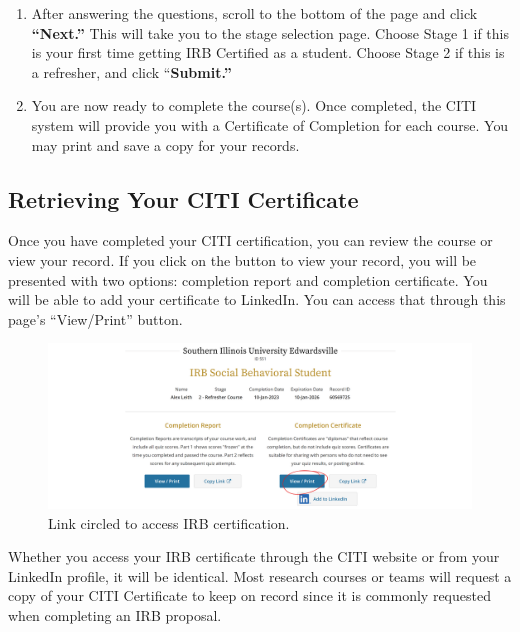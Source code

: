 \documentclass[
]{book}
\begin{document}
\begin{enumerate}
\def\labelenumi{\arabic{enumi}.}
\setcounter{enumi}{3}
\item
  After answering the questions, scroll to the bottom of the page and click \textbf{``Next.''} This will take you to the stage selection page. Choose Stage 1 if this is your first time getting IRB Certified as a student. Choose Stage 2 if this is a refresher, and click ``\textbf{Submit.''}
\item
  You are now ready to complete the course(s). Once completed, the CITI system will provide you with a Certificate of Completion for each course. You may print and save a copy for your records.
\end{enumerate}

\subsection*{Retrieving Your CITI Certificate}\label{retrieving-your-citi-certificate}

Once you have completed your CITI certification, you can review the course or view your record. If you click on the button to view your record, you will be presented with two options: completion report and completion certificate. You will be able to add your certificate to LinkedIn. You can access that through this page's ``View/Print'' button.

\begin{figure}
\centering
\includegraphics[width=1\textwidth,height=\textheight]{images/citi-cert-link.png}
\caption{Link circled to access IRB certification.}
\end{figure}

Whether you access your IRB certificate through the CITI website or from your LinkedIn profile, it will be identical. Most research courses or teams will request a copy of your CITI Certificate to keep on record since it is commonly requested when completing an IRB proposal.
\end{document}
